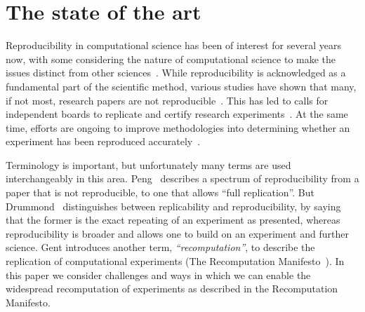 \section{The state of the art}
\label{s:recomputation}

Reproducibility in computational science has been of interest for
several years now, with some considering the nature of computational
science to make the issues distinct from other
sciences~\cite{donoho:reproducible}. While reproducibility is
acknowledged as a fundamental part of the scientific method, various
studies have shown that many, if not most, research papers are not
reproducible~\cite{bonnet:repeatability,hornbaek:replications,ioannidis:repeatability}.
This has led to calls for independent boards to replicate and
certify research experiments~\cite{baker:verify}. At the same time,
efforts are ongoing to improve methodologies into determining whether
an experiment has been reproduced accurately~\cite{johnson:evidence}.

Terminology is important, but unfortunately many terms are used
interchangeably in this area.  Peng~\cite{peng:reproducible} describes
a spectrum of reproducibility from a paper that is not reproducible,
to one that allows ``full replication''. But
Drummond~\cite{drummond:replicability} distinguishes between
replicability and reproducibility, by saying that the former is the
exact repeating of an experiment as presented, whereas reproducibility
is broader and allows one to build on an experiment and further
science. Gent introduces another term, \emph{``recomputation''}, to describe
the replication of computational experiments (The Recomputation
Manifesto~\cite{gent:recomputation}).
In this paper we consider challenges and ways in which we can enable
the widespread recomputation of experiments as described in the
Recomputation Manifesto.

